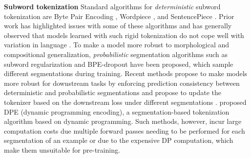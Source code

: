 \documentclass{article} \usepackage{iclr2022_conference,times}
\begin{document}
\noindent \textbf{Subword tokenization}  Standard algorithms for \emph{deterministic} subword tokenization are Byte Pair Encoding \citep[BPE;][]{sennrich-etal-2016-neural}, Wordpiece \citep{Wu2016nmt}, and SentencePiece \citep{kudo-richardson-2018-sentencepiece}. Prior work has highlighted issues with some of these algorithms \citep{Bostrom2020} and has generally observed that models learned with such rigid tokenization do not cope well with variation in language \citep{sun2020adv}. To make a model more robust to morphological and compositional generalization, \emph{probabilistic} segmentation algorithms such as subword regularization \citep{kudo-2018-subword} and BPE-dropout \citep{provilkov-etal-2020-bpe} have been proposed, which sample different segmentations during training. Recent methods propose to make models more robust for downstream tasks by enforcing prediction consistency between deterministic and probabilistic segmentations \citep{Wang2021multi-view} and propose to update the tokenizer based on the downstream loss under different segmentations \citep{hiraoka-etal-2020-optimizing,Hiraoka2021joint}. \citet{he-etal-2020-dynamic} proposed DPE (dynamic programming encoding), a segmentation-based tokenization algorithm based on dynamic programming. Such methods, however, incur large computation costs due multiple forward passes needing to be performed for each segmentation of an example or due to the expensive DP computation, which make them unsuitable for pre-training. 
\end{document}
